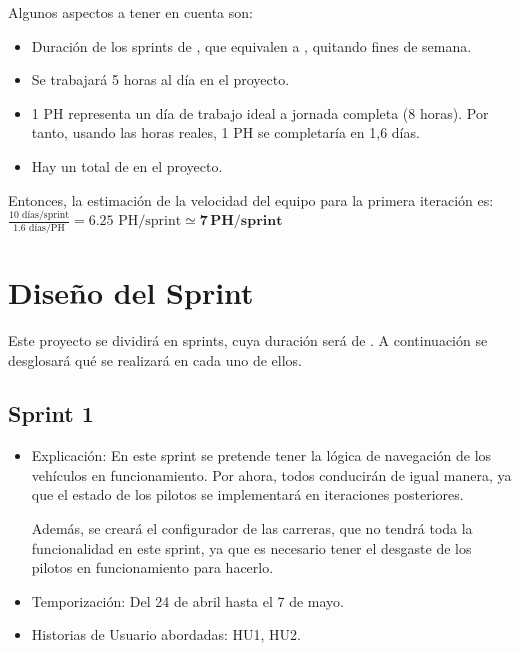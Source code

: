 \bigskip

Algunos aspectos a tener en cuenta son:

\begin{itemize}
    \item Duración de los sprints de \sprintLength, que equivalen a \actualSprintLength, quitando fines de semana.
    \item Se trabajará 5 horas al día en el proyecto.
    \item 1 PH representa un día de trabajo ideal a jornada completa (8 horas). Por tanto, usando las horas reales, 1 PH se completaría en 1,6 días.
    \item Hay un total de \projectph en el proyecto.
\end{itemize}

\bigskip

Entonces, la estimación de la velocidad del equipo para la primera iteración es: $\frac{10 \text{ días/sprint}}{1.6 \text{ días/PH}} = 6.25 \text{ PH/sprint} \simeq \mathbf{7\,PH/sprint}$

\section{Diseño del Sprint}

Este proyecto se dividirá en \sprintNro sprints, cuya duración será de \sprintLength. A continuación se desglosará qué se realizará en cada uno de ellos.

\subsection{Sprint 1}
\begin{itemize}
    \item Explicación: En este sprint se pretende tener la lógica de navegación de los vehículos en funcionamiento. Por ahora, todos conducirán de igual manera, ya que el estado de los pilotos se implementará en iteraciones posteriores.
    
    Además, se creará el configurador de las carreras, que no tendrá toda la funcionalidad en este sprint, ya que es necesario tener el desgaste de los pilotos en funcionamiento para hacerlo.

    \item Temporización: Del 24 de abril hasta el 7 de mayo.
    \item Historias de Usuario abordadas: HU1, HU2.
\end{itemize}

